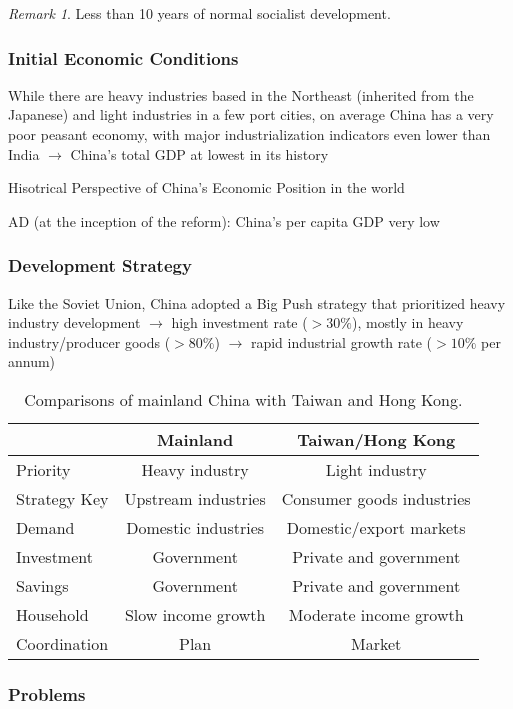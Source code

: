 \documentclass[11pt]{article}
\theoremstyle{definition}
\theoremstyle{remark}
\newtheorem*{remark}{Remark}
\begin{document}
\begin{remark}
Less than 10 years of normal socialist development.
\end{remark}

\subsubsection{Initial Economic Conditions}
While there are heavy industries based in the Northeast (inherited from the Japanese) and light industries in a few port cities, on average China has a very poor peasant economy, with major industrialization indicators even lower than India $\to$ China's total GDP at lowest in its history

Hisotrical Perspective of China's Economic Position in the world
\begin{outline}[enumerate]
 AD (at the inception of the reform): China's per capita GDP very low
\end{outline}

\subsubsection{Development Strategy}
Like the Soviet Union, China adopted a Big Push strategy that prioritized heavy industry development $\to$ high investment rate ($> 30\%$), mostly in heavy industry/producer goods ($> 80\%$) $\to$ rapid industrial growth rate ($>10\%$ per annum)

\begin{table}[ht]
\centering
\caption{Comparisons of mainland China with Taiwan and Hong Kong.}
\begin{tabular}[t]{lcc}
\toprule
&Mainland&Taiwan/Hong Kong\\
\midrule
Priority&Heavy industry&Light industry\\
Strategy Key&Upstream industries&Consumer goods industries\\
Demand&Domestic industries&Domestic/export markets\\
Investment&Government&Private and government\\
Savings&Government&Private and government\\
Household&Slow income growth&Moderate income growth\\
Coordination&Plan&Market\\
\bottomrule
\end{tabular}
\end{table}%

\subsubsection{Problems}
\end{document}
